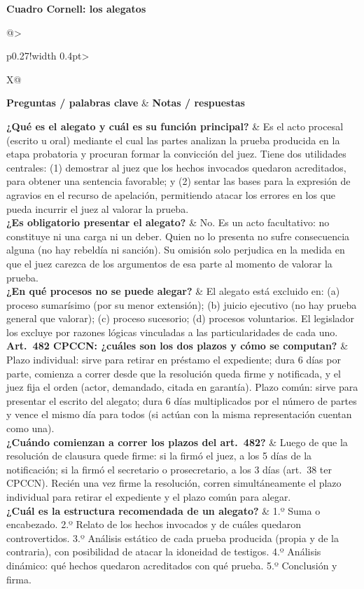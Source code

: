 \documentclass[12pt,oneside]{book}
\makeatletter
\newcommand{\cornelltitle}[1]{\par\bigskip\noindent\textbf{\sffamily Cuadro Cornell: #1}\par\nopagebreak\smallskip}
\newcommand{\cqrow}[2]{\textbf{#1} & #2 \\[0.5em]}
\newcommand{\cornellblock}[1]{%
  \noindent\begin{tabularx}{\textwidth}{@{}>{\raggedright\arraybackslash}p{0.27\textwidth}!{\vrule width 0.4pt}>{\raggedright\arraybackslash}X@{}}
  \toprule
  \textbf{Preguntas / palabras clave} & \textbf{Notas / respuestas} \\
  \midrule
  #1
  \bottomrule
  \end{tabularx}\par}
\makeatother
\begin{document}
\cornelltitle{los alegatos}
\cornellblock{
\cqrow{¿Qué es el alegato y cuál es su función principal?}{Es el acto procesal (escrito u oral) mediante el cual las partes analizan la prueba producida en la etapa probatoria y procuran formar la convicción del juez. Tiene dos utilidades centrales: (1) demostrar al juez que los hechos invocados quedaron acreditados, para obtener una sentencia favorable; y (2) sentar las bases para la expresión de agravios en el recurso de apelación, permitiendo atacar los errores en los que pueda incurrir el juez al valorar la prueba.
}
\cqrow{¿Es obligatorio presentar el alegato?}{No. Es un acto facultativo: no constituye ni una carga ni un deber. Quien no lo presenta no sufre consecuencia alguna (no hay rebeldía ni sanción). Su omisión solo perjudica en la medida en que el juez carezca de los argumentos de esa parte al momento de valorar la prueba.
}
\cqrow{¿En qué procesos no se puede alegar?}{El alegato está excluido en: (a) proceso sumarísimo (por su menor extensión); (b) juicio ejecutivo (no hay prueba general que valorar); (c) proceso sucesorio; (d) procesos voluntarios. El legislador los excluye por razones lógicas vinculadas a las particularidades de cada uno.
}
\cqrow{Art.~482 CPCCN: ¿cuáles son los dos plazos y cómo se computan?}{Plazo individual: sirve para retirar en préstamo el expediente; dura 6 días por parte, comienza a correr desde que la resolución queda firme y notificada, y el juez fija el orden (actor, demandado, citada en garantía). Plazo común: sirve para presentar el escrito del alegato; dura 6 días multiplicados por el número de partes y vence el mismo día para todos (si actúan con la misma representación cuentan como una).
}
\cqrow{¿Cuándo comienzan a correr los plazos del art.~482?}{Luego de que la resolución de clausura quede firme: si la firmó el juez, a los 5 días de la notificación; si la firmó el secretario o prosecretario, a los 3 días (art.~38 ter CPCCN). Recién una vez firme la resolución, corren simultáneamente el plazo individual para retirar el expediente y el plazo común para alegar.
}
\cqrow{¿Cuál es la estructura recomendada de un alegato?}{1.º Suma o encabezado. 2.º Relato de los hechos invocados y de cuáles quedaron controvertidos. 3.º Análisis estático de cada prueba producida (propia y de la contraria), con posibilidad de atacar la idoneidad de testigos. 4.º Análisis dinámico: qué hechos quedaron acreditados con qué prueba. 5.º Conclusión y firma.
}
}
\medskip
\end{document}
